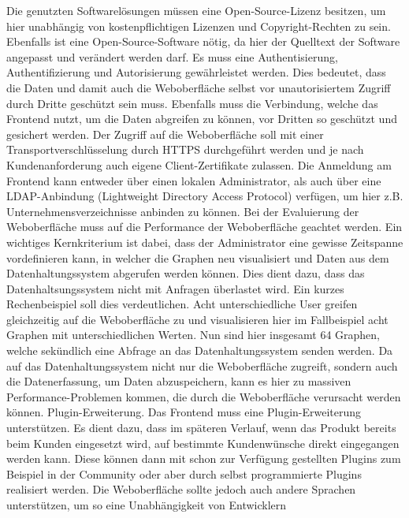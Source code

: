 \begin{outline}
  \1 Die genutzten Softwarelösungen müssen eine Open-Source-Lizenz besitzen, um
  hier unabhängig von kostenpflichtigen Lizenzen und Copyright-Rechten zu sein.
  Ebenfalls ist eine Open-Source-Software nötig, da hier der Quelltext der
  Software angepasst und verändert werden darf.
  \1 Es muss eine Authentisierung, Authentifizierung und Autorisierung
  gewährleistet werden. Dies bedeutet, dass die Daten und damit auch die
  Weboberfläche selbst vor unautorisiertem Zugriff durch Dritte geschützt sein
  muss. Ebenfalls muss die Verbindung, welche das Frontend nutzt, um die Daten
  abgreifen zu können, vor Dritten so geschützt und gesichert werden. Der
  Zugriff auf die Weboberfläche soll mit einer Transportverschlüsselung durch
  \gls{HTTPS} durchgeführt werden und je nach Kundenanforderung auch eigene
  Client-Zertifikate zulassen. Die Anmeldung am Frontend kann entweder über
  einen lokalen Administrator, als auch über eine LDAP-Anbindung (Lightweight
  Directory Access Protocol) verfügen, um hier z.B. Unternehmensverzeichnisse
  anbinden zu können.
  \1 Bei der Evaluierung der Weboberfläche muss auf die Performance der
  Weboberfläche geachtet werden. Ein wichtiges Kernkriterium ist dabei, dass
  der Administrator eine gewisse Zeitspanne vordefinieren kann, in welcher die
  Graphen neu visualisiert und Daten aus dem Datenhaltungssystem abgerufen
  werden können. Dies dient dazu, dass das Datenhaltsungssystem nicht mit
  Anfragen überlastet wird. Ein kurzes Rechenbeispiel soll dies verdeutlichen.
  Acht unterschiedliche User greifen gleichzeitig auf die Weboberfläche zu und
  visualisieren hier im Fallbeispiel acht Graphen mit unterschiedlichen
  Werten. Nun sind hier insgesamt 64 Graphen, welche sekündlich eine Abfrage an
  das Datenhaltungssystem senden werden. Da auf das Datenhaltungssystem nicht
  nur die Weboberfläche zugreift, sondern auch die Datenerfassung, um Daten
  abzuspeichern, kann es hier zu massiven Performance-Problemen kommen, die
  durch die Weboberfläche verursacht werden können.
  \1 Plugin-Erweiterung. Das Frontend muss eine Plugin-Erweiterung
  unterstützen. Es dient dazu, dass im späteren Verlauf, wenn das Produkt
  bereits beim Kunden eingesetzt wird, auf bestimmte Kundenwünsche direkt
  eingegangen werden kann. Diese können dann mit schon zur Verfügung gestellten
  Plugins zum Beispiel in der Community oder aber durch selbst programmierte
  Plugins realisiert werden. Die Weboberfläche sollte jedoch auch andere
  Sprachen unterstützen, um so eine Unabhängigkeit von Entwicklern

\end{outline}
